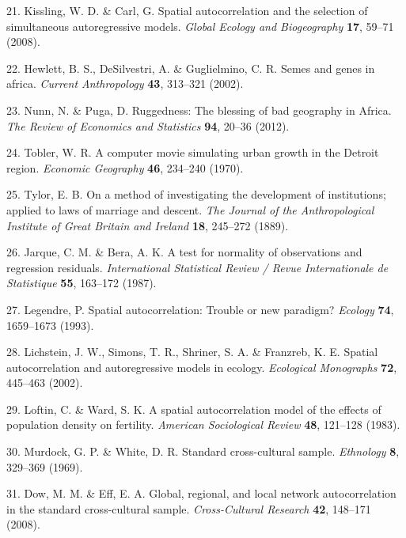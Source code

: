 \documentclass[
  english,
  man,floatsintext]{apa6}
\begin{document}
\leavevmode\hypertarget{ref-Kissling2008}{}%
21. Kissling, W. D. \& Carl, G. Spatial autocorrelation and the selection of simultaneous autoregressive models. \emph{Global Ecology and Biogeography} \textbf{17}, 59--71 (2008).

\leavevmode\hypertarget{ref-Hewlett2002}{}%
22. Hewlett, B. S., DeSilvestri, A. \& Guglielmino, C. R. Semes and genes in africa. \emph{Current Anthropology} \textbf{43}, 313--321 (2002).

\leavevmode\hypertarget{ref-Nunn2012}{}%
23. Nunn, N. \& Puga, D. Ruggedness: The blessing of bad geography in Africa. \emph{The Review of Economics and Statistics} \textbf{94}, 20--36 (2012).

\leavevmode\hypertarget{ref-Tobler1970}{}%
24. Tobler, W. R. A computer movie simulating urban growth in the Detroit region. \emph{Economic Geography} \textbf{46}, 234--240 (1970).

\leavevmode\hypertarget{ref-Tylor1889}{}%
25. Tylor, E. B. On a method of investigating the development of institutions; applied to laws of marriage and descent. \emph{The Journal of the Anthropological Institute of Great Britain and Ireland} \textbf{18}, 245--272 (1889).

\leavevmode\hypertarget{ref-Jarque1987}{}%
26. Jarque, C. M. \& Bera, A. K. A test for normality of observations and regression residuals. \emph{International Statistical Review / Revue Internationale de Statistique} \textbf{55}, 163--172 (1987).

\leavevmode\hypertarget{ref-Legendre1993}{}%
27. Legendre, P. Spatial autocorrelation: Trouble or new paradigm? \emph{Ecology} \textbf{74}, 1659--1673 (1993).

\leavevmode\hypertarget{ref-Lichstein2002}{}%
28. Lichstein, J. W., Simons, T. R., Shriner, S. A. \& Franzreb, K. E. Spatial autocorrelation and autoregressive models in ecology. \emph{Ecological Monographs} \textbf{72}, 445--463 (2002).

\leavevmode\hypertarget{ref-Loftin1983}{}%
29. Loftin, C. \& Ward, S. K. A spatial autocorrelation model of the effects of population density on fertility. \emph{American Sociological Review} \textbf{48}, 121--128 (1983).

\leavevmode\hypertarget{ref-Murdock1969}{}%
30. Murdock, G. P. \& White, D. R. Standard cross-cultural sample. \emph{Ethnology} \textbf{8}, 329--369 (1969).

\leavevmode\hypertarget{ref-Dow2008}{}%
31. Dow, M. M. \& Eff, E. A. Global, regional, and local network autocorrelation in the standard cross-cultural sample. \emph{Cross-Cultural Research} \textbf{42}, 148--171 (2008).
\end{document}
